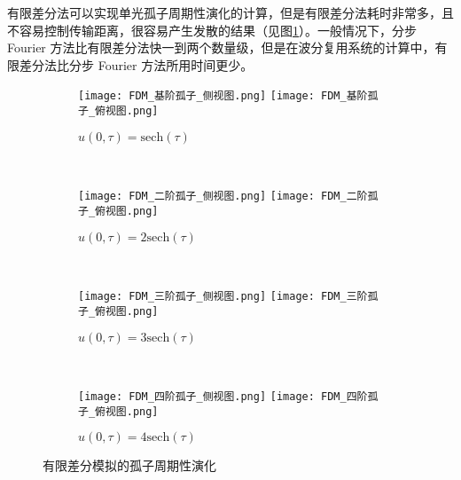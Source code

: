有限差分法可以实现单光孤子周期性演化的计算，但是有限差分法耗时非常多，且不容易控制传输距离，很容易产生发散的结果（见图\ref{fig:FDM}）。一般情况下，分步 Fourier 方法比有限差分法快一到两个数量级，但是在波分复用系统的计算中，有限差分法比分步 Fourier 方法所用时间更少\cite{Agrawal}。
\begin{figure}[tbp]
    \centering
    \begin{subfigure}[t]{0.85\linewidth}
        \captionsetup{justification=centering} 
        \begin{minipage}[b]{1\linewidth}
        \texttt{[image: FDM\_基阶孤子\_侧视图.png]}
        \texttt{[image: FDM\_基阶孤子\_俯视图.png]}
        \caption{$u(0,\tau)=\mathrm{sech}(\tau)$}
        \end{minipage}
    \end{subfigure}\\
    \begin{subfigure}[t]{0.85\linewidth}
        \captionsetup{justification=centering} 
        \begin{minipage}[b]{1\linewidth}
        \texttt{[image: FDM\_二阶孤子\_侧视图.png]}
        \texttt{[image: FDM\_二阶孤子\_俯视图.png]}
        \caption{$u(0,\tau)=2\mathrm{sech}(\tau)$}
        \end{minipage}
    \end{subfigure}\\
    \begin{subfigure}[t]{0.85\linewidth}
        \captionsetup{justification=centering} 
        \begin{minipage}[b]{1\linewidth}
        \texttt{[image: FDM\_三阶孤子\_侧视图.png]}
        \texttt{[image: FDM\_三阶孤子\_俯视图.png]}
        \caption{$u(0,\tau)=3\mathrm{sech}(\tau)$}
        \end{minipage}
    \end{subfigure}\\
    \begin{subfigure}[t]{0.85\linewidth}
        \captionsetup{justification=centering} 
        \begin{minipage}[b]{1\linewidth}
        \texttt{[image: FDM\_四阶孤子\_侧视图.png]}
        \texttt{[image: FDM\_四阶孤子\_俯视图.png]}
        \caption{$u(0,\tau)=4\mathrm{sech}(\tau)$}
        \end{minipage}
    \end{subfigure}
    \caption{有限差分模拟的孤子周期性演化}
    \label{fig:FDM}
\end{figure}